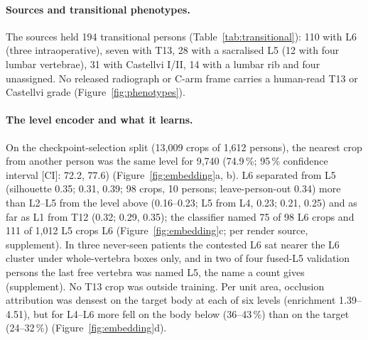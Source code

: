 \paragraph{Sources and transitional phenotypes.}
The sources held 194 transitional persons (Table~\ref{tab:transitional}): 110 with L6 (three intraoperative), seven
with T13, 28 with a sacralised L5 (12 with four lumbar vertebrae), 31 with Castellvi I/II, 14 with a lumbar rib and
four unassigned. No released radiograph or C-arm frame carries a human-read T13 or Castellvi grade
(Figure~\ref{fig:phenotypes}).

\paragraph{The level encoder and what it learns.}
On the checkpoint-selection split (13,009 crops of 1,612 persons), the nearest crop from another person was the
same level for 9,740 (74.9\,\%; 95\,\% confidence interval [CI]: 72.2, 77.6) (Figure~\ref{fig:embedding}a, b). L6
separated from L5 (silhouette 0.35; 0.31, 0.39; 98 crops, 10 persons; leave-person-out 0.34) more
than L2--L5 from the level above (0.16--0.23; L5 from L4, 0.23; 0.21, 0.25) and as far as L1 from T12 (0.32; 0.29,
0.35); the classifier named 75 of 98 L6 crops and 111 of 1,012 L5 crops L6 (Figure~\ref{fig:embedding}c; per
render source, supplement). In three
never-seen patients the contested L6 sat nearer the L6 cluster under whole-vertebra boxes only, and in two of four
fused-L5 validation persons the last free vertebra was named L5, the name a count gives (supplement). No T13 crop was outside training. Per unit area, occlusion
attribution was densest on the target body at each of six levels (enrichment 1.39--4.51), but for L4--L6 more fell on
the body below (36--43\,\%) than on the target (24--32\,\%) (Figure~\ref{fig:embedding}d).

